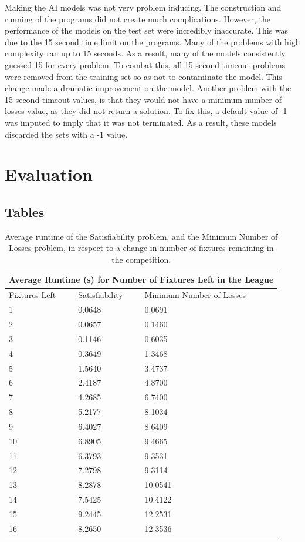 \documentclass{article}
\begin{document}
	Making the AI models was not very problem inducing. The construction and running of the programs did not create much complications. However, the performance of the models on the test set were incredibly inaccurate. This was due to the 15 second time limit on the programs. Many of the problems with high complexity ran up to 15 seconds. As a result, many of the models consistently guessed 15 for every problem. To combat this, all 15 second timeout problems were removed from the training set so as not to contaminate the model. This change made a dramatic improvement on the model.
	Another problem with the 15 second timeout values, is that they would not have a minimum number of losses value, as they did not return a solution. To fix this, a default value of -1 was imputed to imply that it was not terminated. As a result, these models discarded the sets with a -1 value.
	
	

	\newpage
	\section{Evaluation}
	
	\subsection{Tables}
	
	\begin{table}[h!]
		\centering
		\begin{tabular}{ |p{1.5cm}||p{3cm}| |p{3cm}| }
			\hline\multicolumn{3}{|c|}{Average Runtime (s) for Number of Fixtures Left in the League} \\
			\hline
			\hline
			Fixtures Left & Satisfiability & Minimum Number of Losses\\
			\hline
			1   & 0.0648    & 0.0691\\
			2&   0.0657  & 0.1460\\
			3 & 0.1146 & 0.6035\\
			4 & 0.3649 & 1.3468\\
			5&   1.5640  & 3.4737\\
			6& 2.4187  & 4.8700\\
			7& 4.2685  & 6.7400\\
			8& 5.2177  & 8.1034\\
			9& 6.4027  & 8.6409\\
			10& 6.8905  & 9.4665\\
			11& 6.3793  & 9.3531\\
			12& 7.2798  & 9.3114\\
			13& 8.2878  & 10.0541\\
			14& 7.5425  & 10.4122\\
			15& 9.2445  & 12.2531\\
			16& 8.2650  & 12.3536\\
			\hline
		\end{tabular}
		\caption{Average runtime of the Satisfiability problem, and the Minimum Number of Losses problem, in respect to a change in number of fixtures remaining in the competition.}
	\end{table}
	
\end{document}
